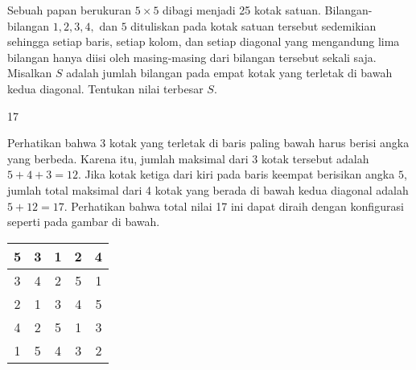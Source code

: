 \documentclass[11pt]{scrartcl}
\begin{document}
	\begin{soaljawab}
		Sebuah papan berukuran $5 \times 5$ dibagi menjadi 25 kotak satuan. Bilangan-bilangan $1,2,3,4,$ dan $5$ dituliskan pada kotak satuan tersebut sedemikian sehingga setiap baris, setiap kolom, dan setiap diagonal yang mengandung lima bilangan hanya diisi oleh masing-masing dari bilangan tersebut sekali saja. Misalkan $S$ adalah jumlah bilangan pada empat kotak yang terletak di bawah kedua diagonal. Tentukan nilai terbesar $S$.
		
		\begin{jawaban}
		17
		\end{jawaban}
		\begin{solusi}
		Perhatikan bahwa 3 kotak yang terletak di baris paling bawah harus berisi angka yang berbeda. Karena itu, jumlah maksimal dari 3 kotak tersebut adalah $5+4+3=12$. Jika kotak ketiga dari kiri pada baris keempat berisikan angka $5$, jumlah total maksimal dari 4 kotak yang berada di bawah kedua diagonal adalah $5+12=17$. Perhatikan bahwa total nilai 17 ini dapat diraih dengan konfigurasi seperti pada gambar di bawah.
		\begin{center} 
		\begin{tabular}{ |c|c|c|c|c| }
			\hline
			5 & 3 & 1 & 2 & 4 \\
			\hline
			3 & 4 & 2 & 5 & 1 \\
			\hline
			2 & 1 & 3 & 4 & 5 \\
			\hline
			4 & 2 & \cellcolor{green!30}5 & 1 & 3 \\
			\hline
			1 &\cellcolor{green!30}5 &\cellcolor{green!30}4 &\cellcolor{green!30}3 & 2 \\
			\hline
		\end{tabular}
		\end{center}
		\end{solusi}
	\end{soaljawab}
		
\end{document}
